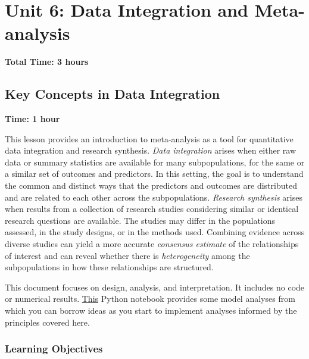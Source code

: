 \chapter{Unit 6: Data Integration and Meta-analysis}
\label{chap:unit6}

\textbf{Total Time: 3 hours}

\section{Key Concepts in Data Integration}
\label{sec:6.1}

\textbf{Time: 1 hour}

This lesson provides an introduction to meta-analysis as a tool for quantitative data integration and research synthesis. \textit{Data integration} arises when either raw data or summary statistics are available for many subpopulations, for the same or a similar set of outcomes and predictors. In this setting, the goal is to understand the common and distinct ways that the predictors and outcomes are distributed and are related to each other across the subpopulations. \textit{Research synthesis} arises when results from a collection of research studies considering similar or identical research questions are available. The studies may differ in the populations assessed, in the study designs, or in the methods used. Combining evidence across diverse studies can yield a more accurate {\em consensus estimate} of the relationships of interest and can reveal whether there is {\em heterogeneity} among the subpopulations in how these relationships are structured.

This document focuses on design, analysis, and interpretation. It includes no code or numerical results. \href{https://github.com/kshedden/case_studies/blob/main/birthweight/birthweight_meta.ipynb}{This} Python notebook provides some model analyses from which you can borrow ideas as you start to implement analyses informed by the principles covered here.

\subsection{Learning Objectives}

